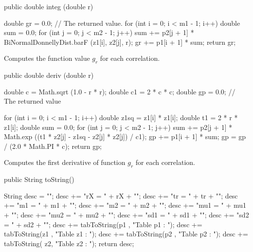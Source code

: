 \begin{code}

   public double integ (double r) \begin{hide}
   {
      double gr = 0.0; // The returned value.
      for (int i = 0; i < m1 - 1; i++) {
         double sum = 0.0;
         for (int j = 0; j < m2 - 1; j++) {
            sum += p2[j + 1]
                   * BiNormalDonnellyDist.barF (z1[i], z2[j], r);
         }
         gr += p1[i + 1] * sum;
      }
      return gr;
   }\end{hide}
\end{code}
\begin{tabb} Computes the function value $g_r$ for each correlation.
\end{tabb}
\begin{code}

   public double deriv (double r)\begin{hide}
   {
      double c = Math.sqrt (1.0 - r * r);
      double c1 = 2 * c * c;
      double gp = 0.0; // The returned value

      for (int i = 0; i < m1 - 1; i++) {
         double z1sq = z1[i] * z1[i];
         double t1 = 2 * r * z1[i];
         double sum = 0.0;
         for (int j = 0; j < m2 - 1; j++) {
            sum += p2[j + 1]
                   * Math.exp ((t1 * z2[j] - z1sq - z2[j] * z2[j]) / c1);
         }
         gp += p1[i + 1] * sum;
      }
      gp = gp / (2.0 * Math.PI * c);
      return gp;
   }\end{hide}
\end{code}
\begin{tabb}  Computes the first derivative of function $g_r$ for each correlation.
\end{tabb}
\begin{code}

   public String toString()\begin{hide}
   {
      String desc = "";
      desc += "rX = " + rX + "\n";
      desc += "tr = " + tr + "\n";
      desc += "m1 = " + m1 + "\n";
      desc += "m2 = " + m2 + "\n";
      desc += "mu1 = " + mu1 + "\n";
      desc += "mu2 = " + mu2 + "\n";
      desc += "sd1 = " + sd1 + "\n";
      desc += "sd2 = " + sd2 + "\n";
      desc += tabToString(p1 , "Table p1 : ");
      desc += tabToString(z1 , "Table z1 : ");
      desc += tabToString(p2 , "Table p2 : ");
      desc += tabToString( z2, "Table z2 : ");
      return desc;
   }\end{hide}
\end{code}

\begin{code}\begin{hide}
}\end{hide}
\end{code}
